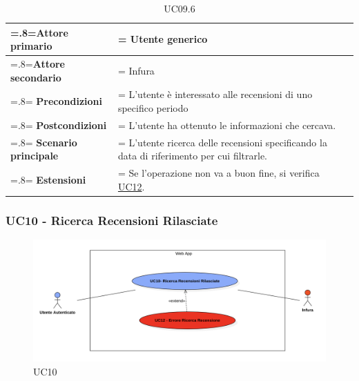             \begin{table}[H]
                \centering
                \renewcommand{\arraystretch}{1.8}
                \renewcommand\tabularxcolumn[1]{m{#1}}
                \begin{tabularx}{0.9\textwidth} {
                    >{\hsize=.8\hsize\linewidth=\hsize}X
                    >{\hsize=1.2\hsize\linewidth=\hsize}X}
                    \hline
                    \textbf{Attore primario} & Utente generico \\
                    \hline
                    \textbf{Attore secondario} & Infura \\
                    \hline
                    \textbf{Precondizioni} & L'utente è interessato alle recensioni di uno specifico periodo \\
                    \hline
                    \textbf{Postcondizioni} & L'utente ha ottenuto le informazioni che cercava. \\
                    \hline
                    \textbf{Scenario principale} & L'utente ricerca delle recensioni specificando la data di riferimento per cui filtrarle.\\
                    \hline
                    \textbf{Estensioni} & Se l'operazione non va a buon fine, si verifica \hyperref[UC12]{UC12}. \\
                    \hline
                \end{tabularx}
                \caption{UC09.6}
            \end{table}

        \subsubsection{UC10 - Ricerca Recensioni Rilasciate}
        \label{UC10}

            \begin{figure}[H]
                \centering
                \includegraphics[scale=0.6]{src/img/UC10.png}
                \caption{UC10}
            \end{figure}

